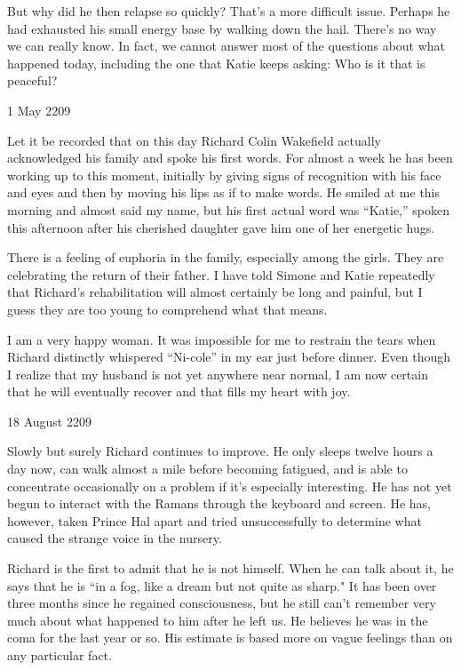 \documentclass[]{article}
\begin{document}
{But why did he then relapse so quickly? That’s a more difficult issue.  Perhaps he had exhausted his small energy base by walking down the hail.  There’s no way we can really know.  In fact, we cannot answer most of the questions about what happened today, including the one that Katie keeps asking: Who is it that is peaceful?

1 May 2209

Let it be recorded that on this day Richard Colin Wakefield actually acknowledged his family and spoke his first words.  For almost a week he has been working up to this moment, initially by giving signs of recognition with his face and eyes and then by moving his lips as if to make words.  He smiled at me this morning and almost said my name, but his first actual word was “Katie,” spoken this afternoon after his cherished daughter gave him one of her energetic hugs.

There is a feeling of euphoria in the family, especially among the girls.  They are celebrating the return of their father.  I have told Simone and Katie repeatedly that Richard’s rehabilitation will almost certainly be long and painful, but I guess they are too young to comprehend what that means.

I am a very happy woman.  It was impossible for me to restrain the tears when Richard distinctly whispered “Ni-cole” in my ear just before dinner.  Even though I realize that my husband is not yet anywhere near normal, I am now certain that he will eventually recover and that fills my heart with joy.

18 August 2209

Slowly but surely Richard continues to improve.  He only sleeps twelve hours a day now, can walk almost a mile before becoming fatigued, and is able to concentrate occasionally on a problem if it’s especially interesting.  He has not yet begun to interact with the Ramans through the keyboard and screen.  He has, however, taken Prince Hal apart and tried unsuccessfully to determine what caused the strange voice in the nursery.

Richard is the first to admit that he is not himself.  When he can talk about it, he says that he is “in a fog, like a dream but not quite as sharp."  It has been over three months since he regained consciousness, but he still can’t remember very much about what happened to him after he left us.  He believes he was in the coma for the last year or so.  His estimate is based more on vague feelings than on any particular fact.

}
\end{document}
